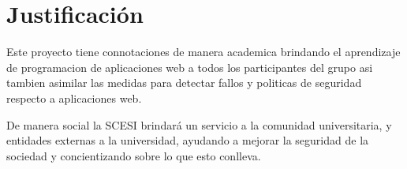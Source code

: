 \documentclass[letter,twoside,11pt]{article}
\begin{document}
\section{Justificación}
Este proyecto tiene connotaciones de manera academica brindando el aprendizaje
de programacion de aplicaciones web a todos los participantes del grupo asi
tambien asimilar las medidas para detectar fallos y politicas de seguridad
respecto a aplicaciones web.

De manera social la SCESI brindará un servicio a la comunidad universitaria, y
entidades externas a la universidad, ayudando a mejorar la seguridad de la
sociedad y concientizando sobre lo que esto conlleva.




\end{document}
